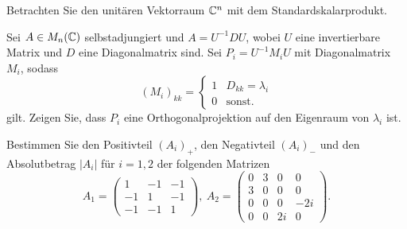 \begin{Problem}
	Betrachten Sie den unitären Vektorraum $\mathbb{C}^n$ mit dem Standardskalarprodukt.
	\begin{parts}
		\item Sei $A\in M_n(\mathbb{C})$ selbstadjungiert und $A=U^{-1}DU$, wobei $U$ eine invertierbare Matrix und $D$ eine Diagonalmatrix sind. Sei $P_i=U^{-1}M_iU$ mit Diagonalmatrix $M_i$, sodass
		\[
			(M_i)_{kk}=\begin{cases}
				1 & D_{kk}=\lambda_i\\
				0 & \text{sonst.}
			\end{cases}
		\]
		gilt. Zeigen Sie, dass $P_i$ eine Orthogonalprojektion auf den Eigenraum von $\lambda_i$ ist.
		\item Bestimmen Sie den Positivteil $(A_i)_+$, den Negativteil $(A_i)_{-}$ und den Absolutbetrag $|A_i|$ f\"{u}r $i=1,2$ der folgenden Matrizen
			\[
				A_1=\begin{pmatrix} 1 & -1 & -1 \\ -1 & 1 & -1 \\ -1 & -1 & 1 \end{pmatrix},~A_2=\begin{pmatrix} 0 & 3 & 0 & 0 \\ 3 & 0 & 0 & 0 \\ 0 & 0 & 0 & -2i \\ 0 & 0 & 2i & 0 \end{pmatrix} 
			.\] 
	\end{parts}
\end{Problem}
